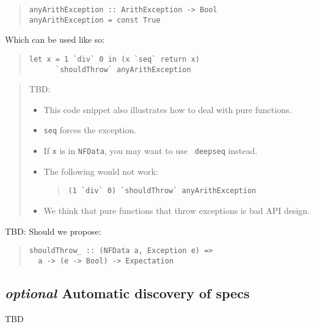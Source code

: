 \documentclass[preprint]{sigplanconf}
\begin{document}
\begin{quote}\small\begin{verbatim}
anyArithException :: ArithException -> Bool
anyArithException = const True
\end{verbatim}\end{quote}

\noindent Which can be used like so:

\begin{quote}\small\begin{verbatim}
let x = 1 `div` 0 in (x `seq` return x)
      `shouldThrow` anyArithException
\end{verbatim}\end{quote}


\begin{quote}
    TBD:
    \begin{itemize}
        \item
            This code snippet also illustrates how to deal with pure
            functions.
        \item
            {\tt seq} forces the exception.
        \item
            If {\tt x} is in {\tt NFData}, you may want to use {\tt
            deepseq} instead.
        \item
            The following would not work:
\begin{quote}\small\begin{verbatim}
(1 `div` 0) `shouldThrow` anyArithException
\end{verbatim}\end{quote}
        \item
            We think that pure functions that throw exceptions is bad
            API design.
    \end{itemize}
\end{quote}

TBD: Should we propose:
\begin{quote}\small\begin{verbatim}
shouldThrow_ :: (NFData a, Exception e) =>
  a -> (e -> Bool) -> Expectation
\end{verbatim}\end{quote}

\subsection{\emph{optional} Automatic discovery of specs}
TBD


\end{document}

